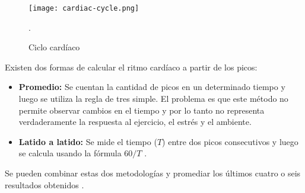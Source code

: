 \begin{figure}[H]
	\centering
    \texttt{[image: cardiac-cycle.png]}
    \caption{Ciclo cardíaco}.
	\label{fig:cardiac-cycle}
\end{figure}

Existen dos formas de calcular el ritmo cardíaco a partir de los picos:

\begin{itemize}
 \item \textbf{Promedio:} Se cuentan la cantidad de picos en un determinado tiempo y luego se utiliza la regla de tres simple. El problema es que este método no permite observar cambios en el tiempo y por lo tanto no representa verdaderamente la respuesta al ejercicio, el estrés y el ambiente.
 \item \textbf{Latido a latido:} Se mide el tiempo ($T$) entre dos picos consecutivos y luego se calcula usando la fórmula $60/T$ \cite{spo2-1}.
\end{itemize}

Se pueden combinar estas dos metodologías y promediar los últimos cuatro o seis resultados obtenidos \cite{spo2-1}.

